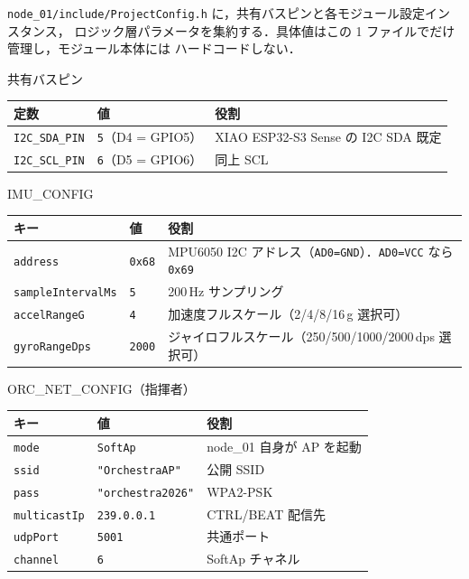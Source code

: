 \documentclass[lualatex,book,paper=a4paper,jafontsize=11.5pt,jafontscale=1.05]{jlreq}
\begin{document}
\texttt{node\_01/include/ProjectConfig.h} に，共有バスピンと各モジュール設定インスタンス，
ロジック層パラメータを集約する．具体値はこの 1 ファイルでだけ管理し，モジュール本体には
ハードコードしない．

\begin{apibox}{共有バスピン}
\begin{tabular}{l l p{}}
\toprule
\textbf{定数} & \textbf{値} & \textbf{役割} \\
\midrule
\texttt{I2C\_SDA\_PIN} & \texttt{5}（D4 = GPIO5） & XIAO ESP32-S3 Sense の I2C SDA 既定 \\
\texttt{I2C\_SCL\_PIN} & \texttt{6}（D5 = GPIO6） & 同上 SCL \\
\bottomrule
\end{tabular}
\end{apibox}

\begin{apibox}{IMU\_CONFIG}
\begin{tabular}{l l p{}}
\toprule
\textbf{キー} & \textbf{値} & \textbf{役割} \\
\midrule
\texttt{address}          & \texttt{0x68} & MPU6050 I2C アドレス（\texttt{AD0=GND}）．\texttt{AD0=VCC} なら \texttt{0x69} \\
\texttt{sampleIntervalMs} & \texttt{5}    & 200\,Hz サンプリング \\
\texttt{accelRangeG}      & \texttt{4}    & 加速度フルスケール（2/4/8/16\,g 選択可） \\
\texttt{gyroRangeDps}     & \texttt{2000} & ジャイロフルスケール（250/500/1000/2000\,dps 選択可） \\
\bottomrule
\end{tabular}
\end{apibox}

\begin{apibox}{ORC\_NET\_CONFIG（指揮者）}
\begin{tabular}{l l p{}}
\toprule
\textbf{キー} & \textbf{値} & \textbf{役割} \\
\midrule
\texttt{mode}        & \texttt{SoftAp}             & node\_01 自身が AP を起動 \\
\texttt{ssid}        & \texttt{"OrchestraAP"}      & 公開 SSID \\
\texttt{pass}        & \texttt{"orchestra2026"}    & WPA2-PSK \\
\texttt{multicastIp} & \texttt{239.0.0.1}          & CTRL/BEAT 配信先 \\
\texttt{udpPort}     & \texttt{5001}               & 共通ポート \\
\texttt{channel}     & \texttt{6}                  & SoftAp チャネル \\
\bottomrule
\end{tabular}
\end{apibox}
\end{document}
